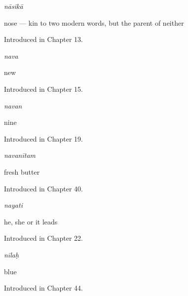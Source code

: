 \noindent\begin{minipage}[t]{\linewidth}
\raggedright
\textbf{}\enspace\emph{nāsikā}\par
\small nose — kin to two modern words, but the parent of neither\par
\footnotesize Introduced in Chapter 13.
\end{minipage}\par\medskip

\noindent\begin{minipage}[t]{\linewidth}
\raggedright
\textbf{}\enspace\emph{nava}\par
\small new\par
\footnotesize Introduced in Chapter 15.
\end{minipage}\par\medskip

\noindent\begin{minipage}[t]{\linewidth}
\raggedright
\textbf{}\enspace\emph{navan}\par
\small nine\par
\footnotesize Introduced in Chapter 19.
\end{minipage}\par\medskip

\noindent\begin{minipage}[t]{\linewidth}
\raggedright
\textbf{}\enspace\emph{navanītam}\par
\small fresh butter\par
\footnotesize Introduced in Chapter 40.
\end{minipage}\par\medskip

\noindent\begin{minipage}[t]{\linewidth}
\raggedright
\textbf{}\enspace\emph{nayati}\par
\small he, she or it leads\par
\footnotesize Introduced in Chapter 22.
\end{minipage}\par\medskip

\noindent\begin{minipage}[t]{\linewidth}
\raggedright
\textbf{}\enspace\emph{nīlaḥ}\par
\small blue\par
\footnotesize Introduced in Chapter 44.
\end{minipage}\par\medskip

